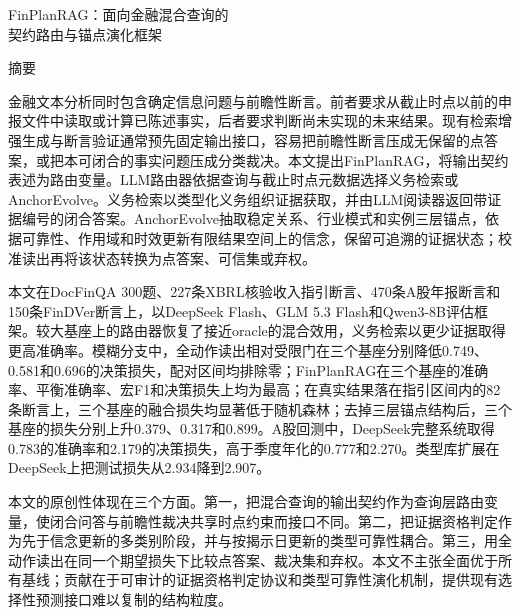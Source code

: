\documentclass[12pt,openany]{ctexbook}
\newcommand{\method}{FinPlanRAG}
\begin{document}
\clearpage
{}
{}
\begin{center}
{\heiti \method：面向金融混合查询的\\[0.2cm]
契约路由与锚点演化框架\par}
\vspace{0.2cm}
{\heiti 摘\quad 要\par}
\end{center}
\vspace{0.2cm}
{\songti\sloppy
\setlength{\parindent}{0pt}
\setlength{\emergencystretch}{2em}
\hspace*{2em}金融文本分析同时包含确定信息问题与前瞻性断言。前者要求从截止时点以前的申报文件中读取或计算已陈述事实，后者要求判断尚未实现的未来结果。现有检索增强生成与断言验证通常预先固定输出接口，容易把前瞻性断言压成无保留的点答案，或把本可闭合的事实问题压成分类裁决。本文提出FinPlanRAG，将输出契约表述为路由变量。LLM路由器依据查询与截止时点元数据选择义务检索或AnchorEvolve。义务检索以类型化义务组织证据获取，并由LLM阅读器返回带证据编号的闭合答案。AnchorEvolve抽取稳定关系、行业模式和实例三层锚点，依据可靠性、作用域和时效更新有限结果空间上的信念，保留可追溯的证据状态；校准读出再将该状态转换为点答案、可信集或弃权。\par
\hspace*{2em}本文在DocFinQA 300题、227条XBRL核验收入指引断言、470条A股年报断言和150条FinDVer断言上，以DeepSeek Flash、GLM 5.3 Flash和Qwen3-8B评估框架。较大基座上的路由器恢复了接近oracle的混合效用，义务检索以更少证据取得更高准确率。模糊分支中，全动作读出相对受限门在三个基座分别降低0.749、0.581和0.696的决策损失，配对区间均排除零；FinPlanRAG在三个基座的准确率、平衡准确率、宏F1和决策损失上均为最高；在真实结果落在指引区间内的82条断言上，三个基座的融合损失均显著低于随机森林；去掉三层锚点结构后，三个基座的损失分别上升0.379、0.317和0.899。A股回测中，DeepSeek完整系统取得0.783的准确率和2.179的决策损失，高于季度年化的0.777和2.270。类型库扩展在DeepSeek上把测试损失从2.934降到2.907。\par
\hspace*{2em}本文的原创性体现在三个方面。第一，把混合查询的输出契约作为查询层路由变量，使闭合问答与前瞻性裁决共享时点约束而接口不同。第二，把证据资格判定作为先于信念更新的多类别阶段，并与按揭示日更新的类型可靠性耦合。第三，用全动作读出在同一个期望损失下比较点答案、裁决集和弃权。本文不主张全面优于所有基线；贡献在于可审计的证据资格判定协议和类型可靠性演化机制，提供现有选择性预测接口难以复制的结构粒度。\par
{}
}
\end{document}
